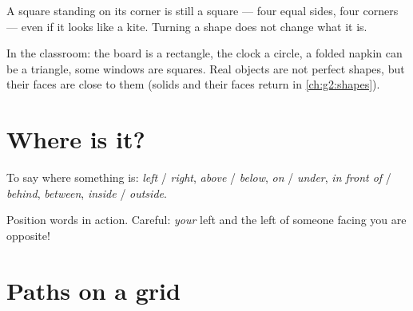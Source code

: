 \begin{example}\label{ex:g1:shapes:tilted}
A square standing on its corner is still a square --- four equal
sides, four corners --- even if it looks like a kite. Turning a
shape does not change what it is.
\end{example}

\begin{example}\label{ex:g1:shapes:hunt}
In the classroom: the board is a rectangle, the clock a circle, a
folded napkin can be a triangle, some windows are squares. Real
objects are not perfect shapes, but their faces are close to them
(solids and their faces return in \cref{ch:g2:shapes}).
\end{example}

\section{Where is it?}

\begin{definition}\label{def:g1:shapes:position}
To say where something is: \emph{left} / \emph{right},
\emph{above} / \emph{below}, \emph{on} / \emph{under},
\emph{in front of} / \emph{behind}, \emph{between},
\emph{inside} / \emph{outside}.
\end{definition}

\begin{omfigure}

{\small Position words in action. Careful: \emph{your} left and the
left of someone facing you are opposite!}
\end{omfigure}

\section{Paths on a grid}

